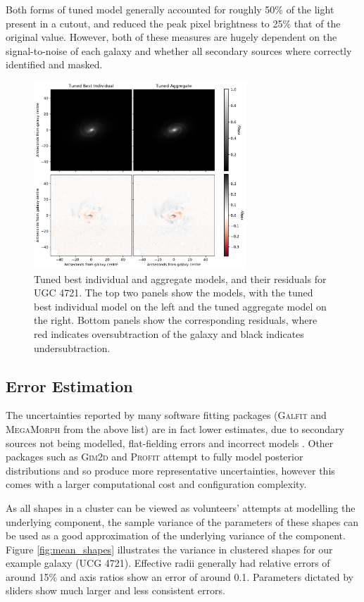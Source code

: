 \documentclass[../main.tex]{subfiles}
\begin{document}
Both forms of tuned model generally accounted for roughly 50\% of the light present in a cutout, and reduced the peak pixel brightness to 25\% that of the original value. However, both of these measures are hugely dependent on the signal-to-noise of each galaxy and whether all secondary sources where correctly identified and masked.


\begin{figure}
  \includegraphics[width=8cm]{images__method/bi_vs_agg_comparison.pdf}
  \caption{Tuned best individual and aggregate models, and their residuals for UGC 4721. The top two panels show the models, with the tuned best individual model on the left and the tuned aggregate model on the right. Bottom panels show the corresponding residuals, where red indicates oversubtraction of the galaxy and black indicates undersubtraction.}
  \label{fig:bi_vs_agg_comparison}
\end{figure}

\subsection{Error Estimation}
\label{sec:error_estimation}
The uncertainties reported by many software fitting packages (\textsc{Galfit} and \textsc{MegaMorph} from the above list) are in fact lower estimates, due to secondary sources not being modelled, flat-fielding errors and incorrect models \citep{2010AJ....139.2097P}. Other packages such as \textsc{Gim2d} and \textsc{Profit} attempt to fully model posterior distributions and so produce more representative uncertainties, however this comes with a larger computational cost and configuration complexity.

As all shapes in a cluster can be viewed as volunteers' attempts at modelling the underlying component, the sample variance of the parameters of these shapes can be used as a good approximation of the underlying variance of the component. Figure \ref{fig:mean_shapes} illustrates the variance in clustered shapes for our example galaxy (UCG 4721).
Effective radii generally had relative errors of around 15\% and axis ratios show an error of around 0.1. Parameters dictated by sliders show much larger and less consistent errors.
\end{document}
